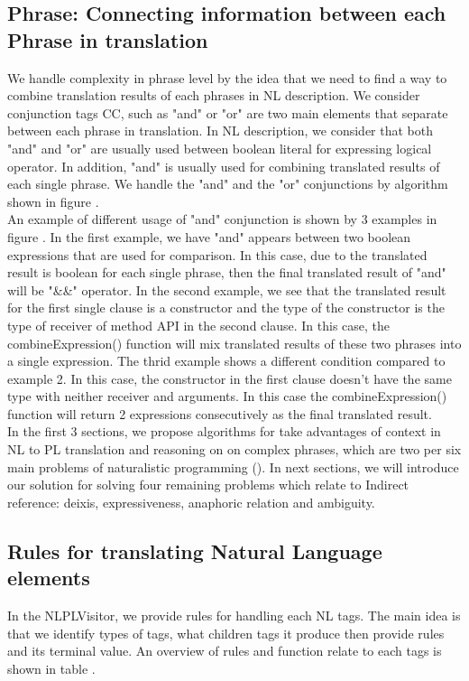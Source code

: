 \subsection{Phrase: Connecting information between each Phrase in translation}
We handle complexity in phrase level by the idea that we need to find a way to combine translation results of each phrases in NL description. We consider conjunction tags CC, such as "and" or "or" are two main elements that separate between each phrase in translation.  In NL description, we consider that both "and" and "or" are usually used between boolean literal for expressing logical operator. In addition, "and" is usually used for combining translated results of each single phrase. We handle the "and" and the "or" conjunctions by algorithm shown in figure \cite{}. \\
An example of different usage of "and" conjunction is shown by 3 examples in figure \cite{}. In the first example, we have "and" appears between two  boolean expressions that are used for comparison. In this case, due to the translated result is boolean for each single phrase, then the final translated result of "and" will be "\&\&" operator. In the second example, we see that the translated result for the first single clause is a constructor and the type of the constructor is the type of receiver of method API in the second clause. In this case, the combineExpression() function will mix translated results of these two phrases into a single expression. The thrid example shows a different condition compared to example 2. In this case, the constructor in the first clause doesn't have the same type with neither receiver and arguments. In this case the combineExpression() function will return 2 expressions consecutively as the final translated result.  \\
In the first 3 sections, we propose algorithms for take advantages of context in NL to PL translation and reasoning on on complex phrases, which are two per six main problems of naturalistic programming (\cite{}). In next sections, we will introduce our solution for solving four remaining problems which relate to Indirect reference: deixis, expressiveness, anaphoric relation and ambiguity.
\subsection{Rules for translating Natural Language elements}
In the NLPLVisitor, we provide rules for handling each NL tags. The main idea is that we identify types of tags, what children tags it produce then provide rules and its terminal value. An overview of rules and function relate to each tags is shown in table \cite{}.


